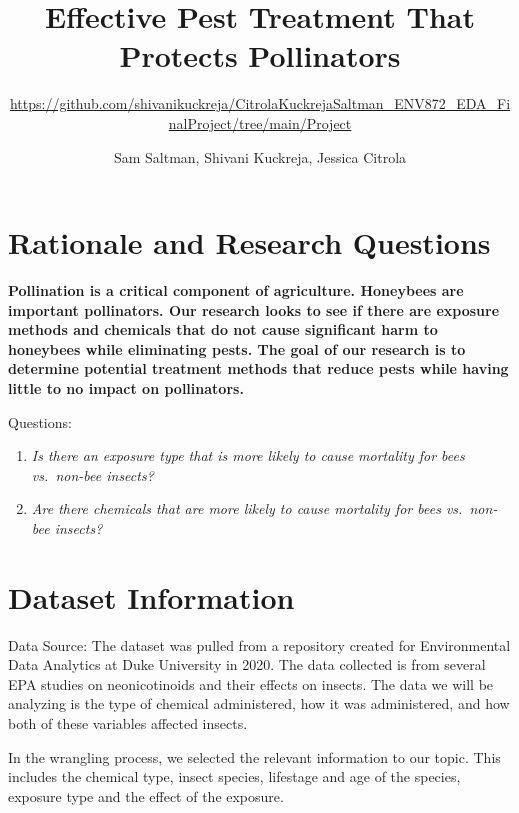 \documentclass[
  12pt,
]{article}
\title{Effective Pest Treatment That Protects Pollinators}
\subtitle{\url{https://github.com/shivanikuckreja/CitrolaKuckrejaSaltman_ENV872_EDA_FinalProject/tree/main/Project}}
\author{Sam Saltman, Shivani Kuckreja, Jessica Citrola}
\date{}
\begin{document}
\maketitle

\newpage
\tableofcontents 
\newpage
\listoftables 
\newpage
\listoffigures 
\newpage

\hypertarget{rationale-and-research-questions}{%
\section{Rationale and Research
Questions}\label{rationale-and-research-questions}}

\textbf{Pollination is a critical component of agriculture. Honeybees
are important pollinators. Our research looks to see if there are
exposure methods and chemicals that do not cause significant harm to
honeybees while eliminating pests. The goal of our research is to
determine potential treatment methods that reduce pests while having
little to no impact on pollinators.}

Questions:

\begin{enumerate}
\def\labelenumi{\arabic{enumi}.}
\item
  \emph{Is there an exposure type that is more likely to cause mortality
  for bees vs.~non-bee insects?}
\item
  \emph{Are there chemicals that are more likely to cause mortality for
  bees vs.~non-bee insects?}
\end{enumerate}

\newpage

\hypertarget{dataset-information}{%
\section{Dataset Information}\label{dataset-information}}

Data Source: The dataset was pulled from a repository created for
Environmental Data Analytics at Duke University in 2020. The data
collected is from several EPA studies on neonicotinoids and their
effects on insects. The data we will be analyzing is the type of
chemical administered, how it was administered, and how both of these
variables affected insects.

In the wrangling process, we selected the relevant information to our
topic. This includes the chemical type, insect species, lifestage and
age of the species, exposure type and the effect of the exposure.
\end{document}
